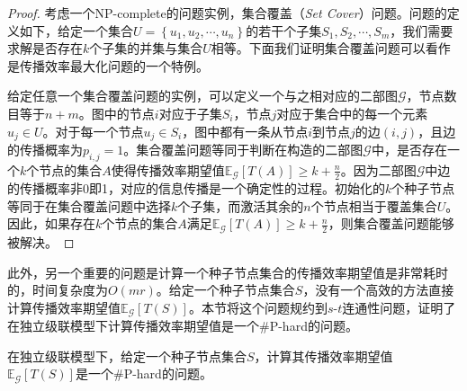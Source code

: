 \begin{proof}\label{pro:npHard}
考虑一个NP-complete的问题实例，集合覆盖（\textit{Set Cover}）问题。问题的定义如下，给定一个集合$U=\left\{u_1, u_2, \cdots, u_n\right\}$的若干个子集$S_1, S_2, \cdots, S_m$，我们需要求解是否存在$k$个子集的并集与集合$U$相等。下面我们证明集合覆盖问题可以看作是传播效率最大化问题的一个特例。

给定任意一个集合覆盖问题的实例，可以定义一个与之相对应的二部图$\mathcal{G}$，节点数目等于$n+m$。图中的节点$i$对应于子集$S_i$，节点$j$对应于集合中的每一个元素$u_j \in U$。对于每一个节点$u_j \in S_i$，图中都有一条从节点$i$到节点$j$的边$\left(i,j\right)$，且边的传播概率为$p_{i,j}=1$。集合覆盖问题等同于判断在构造的二部图$\mathcal{G}$中，是否存在一个$k$个节点的集合$A$使得传播效率期望值$\mathbb{E}_\mathcal{G}\left[T\left(A\right)\right] \geq k+\frac{n}{2}$。因为二部图$\mathcal{G}$中边的传播概率非0即1，对应的信息传播是一个确定性的过程。初始化的$k$个种子节点等同于在集合覆盖问题中选择$k$个子集，而激活其余的$n$个节点相当于覆盖集合$U$。因此，如果存在$k$个节点的集合$A$满足$\mathbb{E}_\mathcal{G}\left[T\left(A\right)\right] \geq k+\frac{n}{2}$，则集合覆盖问题能够被解决。
\end{proof}

此外，另一个重要的问题是计算一个种子节点集合的传播效率期望值是非常耗时的，时间复杂度为$O\left(mr\right)$。给定一个种子节点集合$S$，没有一个高效的方法直接计算传播效率期望值$\mathbb{E}_\mathcal{G}\left[T\left(S\right)\right]$。本节将这个问题规约到$s$-$t$连通性问题，证明了在独立级联模型下计算传播效率期望值是一个\#P-hard的问题。

\begin{mytheo} \label{theo:sharpHard}
在独立级联模型下，给定一个种子节点集合$S$，计算其传播效率期望值$\mathbb{E}_\mathcal{G}\left[T\left(S\right)\right]$是一个\#P-hard的问题。
\end{mytheo}

